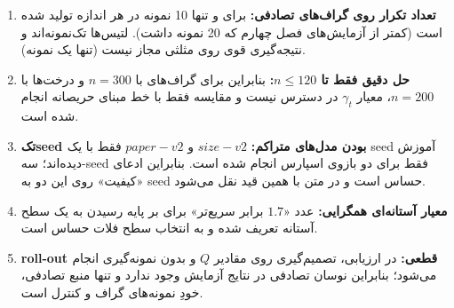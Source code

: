 \begin{enumerate}
  \item \textbf{تعداد تکرار روی گراف‌های تصادفی:} برای  و  تنها
        \num{10} نمونه در هر اندازه تولید شده است (کمتر از آزمایش‌های فصل چهارم
        که \num{20} نمونه داشت). لتیس‌ها تک‌نمونه‌اند و نتیجه‌گیری قوی روی مثلثی
        مجاز نیست (تنها یک نمونه).
  \item \textbf{حل دقیق فقط تا $n\le120$:} بنابراین برای گراف‌های 
        با $n=300$ و درخت‌ها با $n=200$، معیار $\gamma_t$ در دسترس نیست و مقایسه
        فقط با خط مبنای حریصانه انجام شده است.
  \item \textbf{تک‌seed بودن مدل‌های متراکم:} $size-v2$ و $paper-v2$ فقط با
        یک seed آموزش دیده‌اند؛ سه-seed فقط برای دو بازوی اسپارس انجام شده است.
        بنابراین ادعای «کیفیت» روی این دو  به seed حساس است و در
        متن با همین قید نقل می‌شود.
  \item \textbf{معیار آستانه‌ای همگرایی:} عدد «$1.7$ برابر سریع‌تر» برای
         بر پایه رسیدن به یک سطح آستانه تعریف شده و به انتخاب سطح فلات
        حساس است.
  \item \textbf{roll-out قطعی:} در ارزیابی، تصمیم‌گیری روی مقادیر $Q$ و بدون
        نمونه‌گیری انجام می‌شود؛ بنابراین نوسان تصادفی در نتایج آزمایش وجود ندارد
        و تنها منبع تصادفی، خودِ نمونه‌های گراف و کنترل  است.
\end{enumerate}
